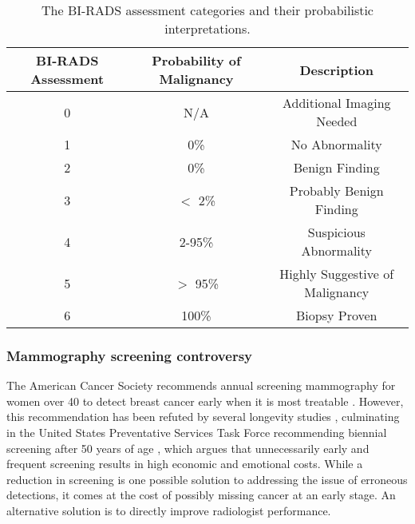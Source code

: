 \begin{table}[ht!]
\centering
\begin{tabular}{|c|c|c|}
	\hline  BI-RADS Assessment&  Probability of Malignancy & Description \\ 
	\hline\hline
	0& N/A & Additional Imaging Needed \\ 
	\hline
	1& 0\% & No Abnormality \\ 
	\hline  
	2& 0\% & Benign Finding  \\ 
	\hline  
	3& $<$ 2\% & Probably Benign Finding \\ 
	\hline  
	4& 2-95\% & Suspicious Abnormality \\ 
	\hline  
	5& $>$ 95\% & Highly Suggestive of Malignancy \\ 
	\hline  
	6& 100\% & Biopsy Proven \\ 
	\hline 
\end{tabular}
\caption{The BI-RADS assessment categories and their probabilistic interpretations.}
\label{table:birads}
\end{table}


\subsubsection{Mammography screening controversy}
The American Cancer Society recommends annual screening mammography for women over 40 to detect breast cancer early when it is most treatable \cite{Nystrom:2002hb, Smith:2003en, Smart:1997hk}. However, this recommendation has been refuted by several longevity studies \cite{Bleyer:2012dc, Kalager:2012ez},  culminating in the United States Preventative Services Task Force recommending biennial screening after 50 years of age \cite{Kerlikowske:2013ej, Anonymous:2009fl}, which argues that unnecessarily early and frequent screening results in high economic and emotional costs. While a reduction in screening is one possible solution to addressing the issue of erroneous detections, it comes at the cost of possibly missing cancer at an early stage. An alternative solution is to directly improve radiologist performance.
